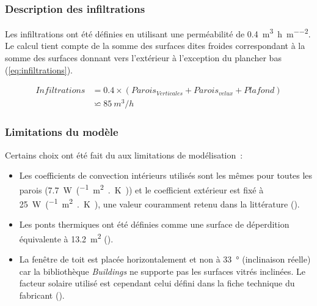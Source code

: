 \subsubsection{Description des infiltrations} %
\label{ssub:description_des_infiltrations}
Les infiltrations ont été définies en utilisant une perméabilité de
\SI{0.4}{m^{3}\per\hour\per\meter\squared}. Le calcul tient compte de la
somme des surfaces dites froides correspondant à la somme des surfaces donnant
vers l’extérieur à l’exception du plancher bas (\eqref{eq:infiltrations}).

\begin{align}
    Infiltrations &= 0.4 \times (Parois_{Verticales} + Parois_{velux} + Plafond)\\
    &              \backsimeq 85~\si{m^{3}/h}
    \label{eq:infiltrations}
\end{align}


\subsubsection{Limitations du modèle} %
\label{ssub:limitations_du_modele}
Certains choix ont été fait du aux limitations de modélisation~:
\begin{itemize}
    \item Les coefficients de convection intérieurs utilisés sont les mêmes pour toutes
          les parois (\SI{7.7}{\watt\per(\meter\squared{.}\kelvin)}) et le coefficient extérieur
          est fixé à \SI{25}{\watt\per(\meter\squared{.}\kelvin)}, une valeur couramment retenu
          dans la littérature ().
    \item Les ponts thermiques ont été définies comme une surface de déperdition
          équivalente à \SI{13.2}{\meter\squared} ().
    \item La fenêtre de toit est placée horizontalement et non à \SI{33}{\degree}
          (inclinaison réelle) car la bibliothèque \textit{Buildings} ne supporte pas les
          surfaces vitrés inclinées. Le facteur solaire utilisé est cependant celui défini
          dans la fiche technique du fabricant ().
\end{itemize}


